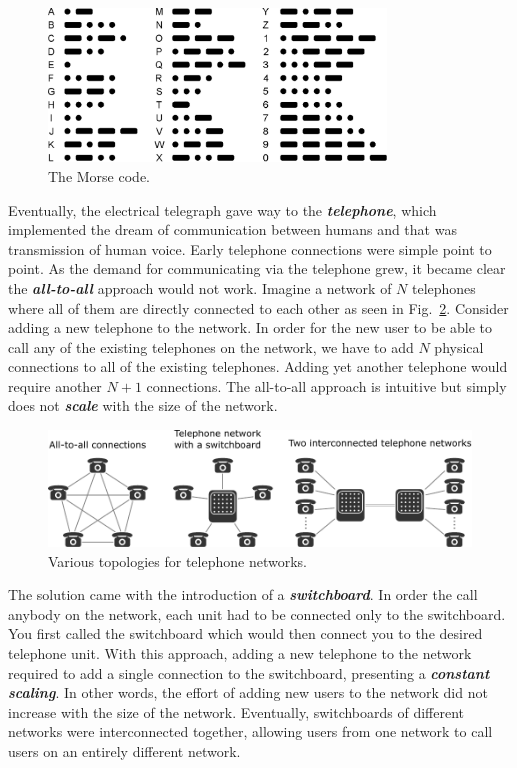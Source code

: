 \begin{figure}[t]
    \centering
    \includegraphics[width=0.8\textwidth]{lesson1/1-1_morse.eps}
    \caption[The Morse code]{The Morse code.}
    \label{fig:1-1_morse}
\end{figure}

Eventually, the electrical telegraph gave way to the \textit{\textbf{telephone}}, which implemented the dream of communication between humans and that was transmission of human voice.
Early telephone connections were simple point to point.
As the demand for communicating via the telephone grew, it became clear the \textit{\textbf{all-to-all}} approach would not work.
Imagine a network of $N$ telephones where all of them are directly connected to each other as seen in Fig.~\ref{fig:1-1_telephone}.
Consider adding a new telephone to the network.
In order for the new user to be able to call any of the existing telephones on the network, we have to add $N$ physical connections to all of the existing telephones.
Adding yet another telephone would require another $N+1$ connections.
The all-to-all approach is intuitive but simply does not \textit{\textbf{scale}} with the size of the network.

\begin{figure}[h]
    \centering
    \includegraphics[width=\textwidth]{lesson1/1-1_rotary_telephone.pdf}
    \caption[Telephone networks]{Various topologies for telephone networks.}
    \label{fig:1-1_telephone}
\end{figure}

The solution came with the introduction of a \textit{\textbf{switchboard}}.
In order the call anybody on the network, each unit had to be connected only to the switchboard.
You first called the switchboard which would then connect you to the desired telephone unit.
With this approach, adding a new telephone to the network required to add a single connection to the switchboard, presenting a \textit{\textbf{constant scaling}}.
In other words, the effort of adding new users to the network did not increase with the size of the network.
Eventually, switchboards of different networks were interconnected together, allowing users from one network to call users on an entirely different network.

